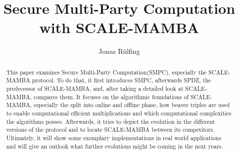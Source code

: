 \documentclass[english,runningheads,a4paper]{llncs}[2018/03/10]
\begin{document}
\title{Secure Multi-Party Computation with SCALE-MAMBA}

\author{Jonas Rülfing}

%
%

\maketitle

\begin{abstract}
This paper examines Secure Multi-Party Computation(SMPC), especially the SCALE-MAMBA protocol. To do that, it first introduces SMPC, afterwards SPDZ, the predecessor of SCALE-MAMBA, and, after taking a detailed look at SCALE-MAMBA, compares them. It focuses on the algorithmic foundations of SCALE-MAMBA, especially the split into online and offline phase, how beaver triples are used to enable computational efficient multiplications and which computational complexities the algorithms posses. Afterwards, it tries to depict the evolution in the different versions of the protocol and to locate SCALE-MAMBA between its competitors. Ultimately, it will show some exemplary implementations in real world applications and will give an outlook what further evolutions might be coming in the next years.
\end{abstract}
\end{document}
